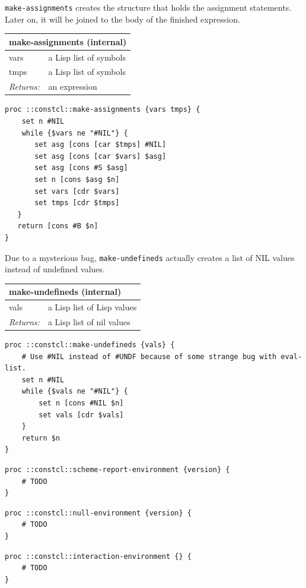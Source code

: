 \documentclass[twoside,9pt]{report}
\begin{document}
\texttt{make-assignments} creates the structure that holds the assignment statements. Later on, it will be joined to the body of the finished expression.

\begin{tabular}{ |l l| }
\hline
\multicolumn{2}{|l|}{make-assignments (internal)} \\
\hline
vars & a Lisp list of symbols \\
tmps & a Lisp list of symbols \\
\textit{Returns:} & an expression \\
\hline
\end{tabular}

\noindent\makebox[\linewidth]{\rule{\linewidth}{0.4pt}}
\begin{lstlisting}
proc ::constcl::make-assignments {vars tmps} {
    set n #NIL
    while {$vars ne "#NIL"} {
       set asg [cons [car $tmps] #NIL]
       set asg [cons [car $vars] $asg]
       set asg [cons #S $asg]
       set n [cons $asg $n]
       set vars [cdr $vars]
       set tmps [cdr $tmps]
   }
   return [cons #B $n]
}
\end{lstlisting}
\noindent\makebox[\linewidth]{\rule{\linewidth}{0.4pt}}

Due to a mysterious bug, \texttt{make-undefineds} actually creates a list of NIL values instead of undefined values.

\begin{tabular}{ |l l| }
\hline
\multicolumn{2}{|l|}{make-undefineds (internal)} \\
\hline
vals & a Lisp list of Lisp values \\
\textit{Returns:} & a Lisp list of nil values \\
\hline
\end{tabular}

\noindent\makebox[\linewidth]{\rule{\linewidth}{0.4pt}}
\begin{lstlisting}
proc ::constcl::make-undefineds {vals} {
    # Use #NIL instead of #UNDF because of some strange bug with eval-list.
    set n #NIL
    while {$vals ne "#NIL"} {
        set n [cons #NIL $n]
        set vals [cdr $vals]
    }
    return $n
}
\end{lstlisting}
\noindent\makebox[\linewidth]{\rule{\linewidth}{0.4pt}}
\noindent\makebox[\linewidth]{\rule{\linewidth}{0.4pt}}
\begin{lstlisting}
proc ::constcl::scheme-report-environment {version} {
    # TODO
}
\end{lstlisting}
\noindent\makebox[\linewidth]{\rule{\linewidth}{0.4pt}}
\noindent\makebox[\linewidth]{\rule{\linewidth}{0.4pt}}
\begin{lstlisting}
proc ::constcl::null-environment {version} {
    # TODO
}
\end{lstlisting}
\noindent\makebox[\linewidth]{\rule{\linewidth}{0.4pt}}
\noindent\makebox[\linewidth]{\rule{\linewidth}{0.4pt}}
\begin{lstlisting}
proc ::constcl::interaction-environment {} {
    # TODO
}
\end{lstlisting}
\noindent\makebox[\linewidth]{\rule{\linewidth}{0.4pt}}
\end{document}
